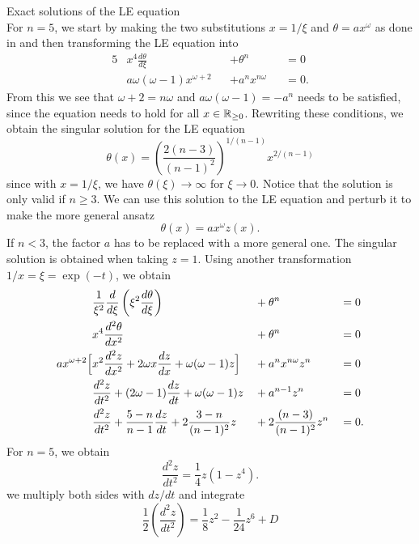 \begin{appendix}
\begin{section}
\begin{subsection}{Exact solutions of the LE equation}
\begin{equation}
\end{equation}
For $n=5$, we start by making the two substitutions $x=1/\xi$ and $\theta=ax^\omega$ as done in \cite[94\psqq]{chandrasekharChandrasekharAnIntroductionStudy1958} and then transforming the LE equation into
\begin{alignat}{5}
	&x^4\frac{d\theta}{d\xi}&&+\theta^n&&=0\\
	&a\omega(\omega-1)x^{\omega+2}&&+a^nx^{n\omega} &&=0.
\end{alignat}
From this we see that $\omega+2=n\omega$ and $a\omega(\omega-1)=-a^n$ needs to be satisfied, since the equation needs to hold for all $x\in\mathbb{R}_{\geq0}$. Rewriting these conditions, we obtain the singular solution for the LE equation
\begin{equation}
	\theta(x) = \left(\frac{2(n-3)}{(n-1)^2}\right)^{1/(n-1)}x^{2/(n-1)}
\end{equation}
since with $x=1/\xi$, we have $\theta(\xi)\rightarrow\infty$ for $\xi\rightarrow0$. Notice that the solution is only valid if $n\geq3$. We can use this solution to the LE equation and perturb it to make the more general ansatz
\begin{equation}
	\theta(x) = ax^\omega z(x).
\end{equation}
If $n<3$, the factor $a$ has to be replaced with a more general one. The singular solution is obtained when taking $z=1$. Using another transformation $1/x=\xi=\exp(-t)$, we obtain
\begin{alignat}{5}
	&\frac{1}{\xi^2}\frac{d}{d\xi}\left(\xi^2\frac{d\theta}{d\xi}\right) &&+ \theta^n &&=0\\
	&x^4\frac{d^2\theta}{dx^2} &&+ \theta^n &&=0\\
	ax^{\omega+2}\Bigl[&x^2\frac{d^2z}{dx^2} + 2\omega x\frac{dz}{dx} + \omega(\omega-1)z\Bigr] &&+ a^nx^{n\omega}z^n &&=0\\
	&\frac{d^2z}{dt^2} + (2\omega-1)\frac{dz}{dt}+\omega(\omega-1)z &&+ a^{n-1}z^n &&=0\\
	&\frac{d^2z}{dt^2} + \frac{5-n}{n-1}\frac{dz}{dt} + 2\frac{3-n}{(n-1)^2}z &&+ 2\frac{(n-3)}{(n-1)^2}z^n &&=0.
\end{alignat}
For $n=5$, we obtain
\begin{equation}
	\frac{d^2z}{dt^2}=\frac{1}{4}z(1-z^4).
\end{equation}
we multiply both sides with $dz/dt$ and integrate
\begin{equation}
	\frac{1}{2}\left(\frac{d^2z}{dt^2}\right) = \frac{1}{8}z^2-\frac{1}{24}z^6+D
	\label{99-App-A-LE-For-n-5-In-z-writing}

\end{equation}
\end{subsection}
\end{section}
\end{appendix}
